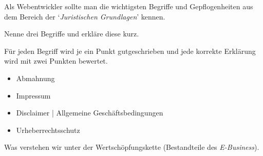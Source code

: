 \documentclass[12pt,a4paper]{exam}
\begin{document}
\begin{questions}

        \addpoints

        \newpage
        \question[10] Als Webentwickler sollte man die wichtigsten Begriffe und
        Gepflogenheiten aus dem Bereich der `\emph{Juristischen Grundlagen}'
        kennen.

        Nenne drei Begriffe und erkläre diese kurz.

        \ifprintanswers
        \begin{solution}
            Für jeden Begriff wird je ein Punkt gutgeschrieben und jede
            korrekte Erklärung wird mit zwei Punkten bewertet.
            \begin{itemize}
                \item Abmahnung
                \item Impressum
                \item Disclaimer | Allgemeine Geschäftsbedingungen
                \item Urheberrechtsschutz
            \end{itemize}
        \end{solution}
        \else\makeemptybox{\fill}
        \fi

        \addpoints

        \newpage
        \question[15] Was verstehen wir unter der Wertschöpfungskette
        (Bestandteile des \emph{E-Business}).


\end{questions}
\end{document}
